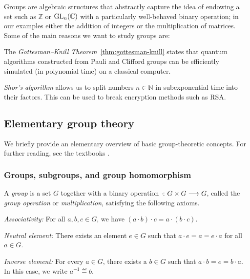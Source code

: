 \documentclass[a4paper, oneside, 12pt]{amsart}
\begin{document}
Groups are algebraic structures that abstractly capture the idea of endowing a set such as \( \mathbb{Z}\) or \( \operatorname{GL}_{n}( \mathbb{C})\) with a particularly well-behaved binary operation; in our examples either the addition of integers or the multiplication of matrices.
Some of the main reasons we want to study groups are:
\begin{thmlist}
  \item The \emph{Gottesman--Knill Theorem}~\ref{thm:gottesman-knill} states that quantum algorithms constructed from  Pauli and Clifford groups can be efficiently simulated (\ie in polynomial time) on a classical computer.
  \item  \emph{Shor's algorithm} allows us to split numbers \(n\in \mathbb{N}\) in subexponential time into their factors.
  This can be used to break encryption methods such as RSA.
\end{thmlist}

\subsection{Elementary group theory}\label{sec:groups}
We briefly provide an elementary overview of basic group-theoretic concepts. For further reading, see the textbooks \cite{lang2002:Algebra,lang1987:UndergraduateAlgebra,rotman1984:INtroductionTheoryGroups}.

\subsubsection{Groups, subgroups, and group homomorphism}\label{sec:groups,-subgroups,-and-group-homomorphism}


\begin{definition}\label{def:group}
  A \emph{group} is a set \( G \) together with a binary operation \( \cdot \from G \times G \to G \), called the \emph{group operation} or \emph{multiplication}, satisfying the following axioms.
  \begin{thmlist}
    \item \emph{Associativity:} For all \( a, b, c \in G \), we have \( (a \cdot b) \cdot c = a \cdot (b \cdot c) \).
    \item \emph{Neutral element:} There exists an element \( e \in G \) such that \( a \cdot e = a = e \cdot a \) for all \( a \in G \).
    \item \emph{Inverse element:} For every \( a \in G \), there exists a \( b \in G \) such that \( a \cdot b = e = b \cdot a \). In this case, we write \( a^{-1} \eqdef b \).
  \end{thmlist}
\end{definition}
\end{document}
